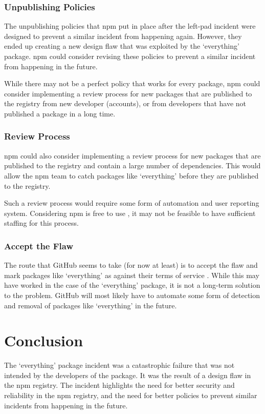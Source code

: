 \documentclass[acmsmall]{acmart}
\begin{document}

\subsubsection{Unpublishing Policies}
The unpublishing policies that npm put in place after the left-pad incident were
designed to prevent a similar incident from happening again. However, they ended
up creating a new design flaw that was exploited by the `everything' package.
npm could consider revising these policies to prevent a similar incident from
happening in the future.

While there may not be a perfect policy that works for every package, npm could
consider implementing a review process for new packages that are published to
the registry from new developer (accounts), or from developers that have not
published a package in a long time.

\subsubsection{Review Process}
npm could also consider implementing a review process for new packages that are
published to the registry and contain a large number of dependencies. This would
allow the npm team to catch packages like `everything' before they are published
to the registry.

Such a review process would require some form of automation and user reporting
system. Considering npm is free to use \cite{npm-tos}, it may not be feasible to
have sufficient staffing for this process.

\subsubsection{Accept the Flaw}
The route that GitHub seems to take (for now at least) is to accept the flaw and
mark packages like `everything' as against their terms of service
\cite{uncenter-blog-everything}. While this may have worked in the case of the
`everything' package, it is not a long-term solution to the problem. GitHub will
most likely have to automate some form of detection and removal of packages like
`everything' in the future.

\section{Conclusion}
The `everything' package incident was a catastrophic failure that was not
intended by the developers of the package. It was the result of a design flaw in
the npm registry. The incident highlights the need for better security and
reliability in the npm registry, and the need for better policies to prevent
similar incidents from happening in the future.
\end{document}
